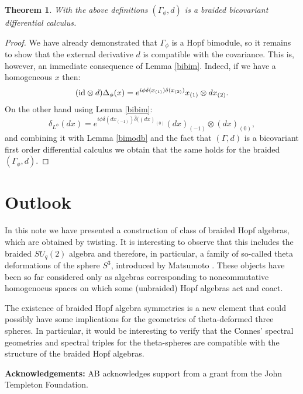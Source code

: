 \documentclass[12pt]{amsart}
\newtheorem{thm}{Theorem}[section]
\theoremstyle{definition}
\numberwithin{equation}{section}
\begin{document}
\begin{thm}
With the above definitions $(\Gamma_\phi, d)$ is a braided bicovariant differential calculus.
\end{thm}
\begin{proof}
We have already demonstrated that $\Gamma_\phi$ is a Hopf bimodule, so it 
remains to show that the external derivative $d$ is compatible with the covariance. This
is, however, an immediate consequence of Lemma \ref{bibim}. Indeed, if we have
a homogeneous $x$ then:
$$ (\hbox{id} \otimes d) \Delta_\phi(x) = e^{i\phi \delta(x_{(1)}) \delta(x_{(2)})} x_{(1)} \otimes dx_{(2)}.$$
On the other hand using Lemma \ref{bibim}:
$$ \delta_{L^\phi} (dx) = e^{i\phi \delta(dx_{(-1)}) \hat{\delta}((dx)_{(0)}} (dx)_{(-1)} \otimes
	(dx)_{(0)},$$
and combining it with Lemma \ref{bimodb} and the fact that $(\Gamma,d)$ is a
bicovariant first order differential calculus we obtain that the same holds for the
braided $(\Gamma_\phi,d)$. 
\end{proof}
\section{Outlook}
In this note we have presented a construction of class of braided Hopf algebras, which
are obtained by twisting. It is interesting to observe that this includes the braided
$SU_q(2)$ algebra and therefore, in particular, a family of so-called theta deformations
of the sphere $S^3$, introduced by Matsumoto \cite{Ma91}. These objects have been so far considered only as
algebras corresponding to noncommutative homogenoeus spaces on which some (unbraided) Hopf 
algebras act and coact. 

The existence of braided Hopf algebra symmetries is a new element that could possibly have some 
implications for the geometries of theta-deformed three spheres. In particular, it
would be interesting to verify that the Connes' spectral geometries and spectral triples
for the theta-spheres \cite{CoLa} are compatible with the structure of the braided Hopf algebras.


{\bf Acknowledgements:} AB acknowledges support from a grant from the John Templeton Foundation.
\end{document}

